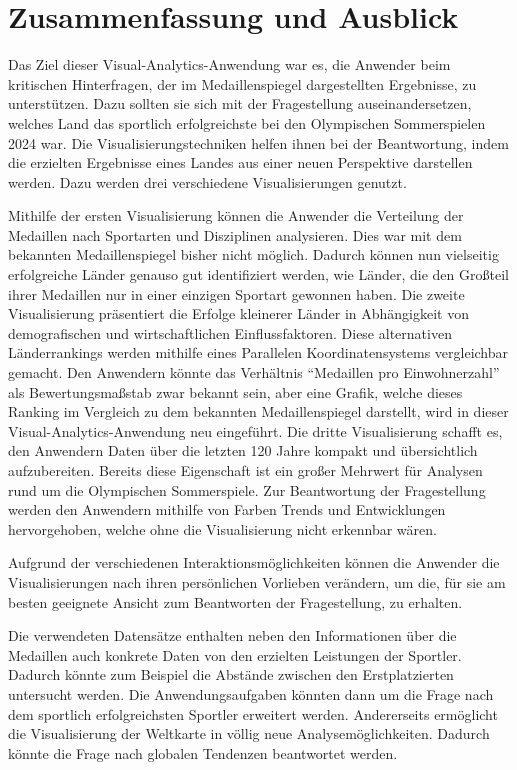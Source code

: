 \section{Zusammenfassung und Ausblick}

Das Ziel dieser Visual-Analytics-Anwendung war es, die Anwender beim kritischen Hinterfragen, der im Medaillenspiegel dargestellten Ergebnisse, zu unterstützen. Dazu sollten sie sich mit der Fragestellung auseinandersetzen, welches Land das sportlich erfolgreichste bei den Olympischen Sommerspielen 2024 war. Die Visualisierungstechniken helfen ihnen bei der Beantwortung, indem die erzielten Ergebnisse eines Landes aus einer neuen Perspektive darstellen werden. Dazu werden drei verschiedene Visualisierungen genutzt.

Mithilfe der ersten Visualisierung können die Anwender die Verteilung der Medaillen nach Sportarten und Disziplinen analysieren. Dies war mit dem bekannten Medaillenspiegel bisher nicht möglich. Dadurch können nun vielseitig erfolgreiche Länder genauso gut identifiziert werden, wie Länder, die den Großteil ihrer Medaillen nur in einer einzigen Sportart gewonnen haben. Die zweite Visualisierung präsentiert die Erfolge kleinerer Länder in Abhängigkeit von demografischen und wirtschaftlichen Einflussfaktoren. Diese alternativen Länderrankings werden mithilfe eines Parallelen Koordinatensystems vergleichbar gemacht. Den Anwendern könnte das Verhältnis \enquote{Medaillen pro Einwohnerzahl} als Bewertungsmaßstab zwar bekannt sein, aber eine Grafik, welche dieses Ranking im Vergleich zu dem bekannten Medaillenspiegel darstellt, wird in dieser Visual-Analytics-Anwendung neu eingeführt. Die dritte Visualisierung schafft es, den Anwendern Daten über die letzten 120 Jahre kompakt und übersichtlich aufzubereiten. Bereits diese Eigenschaft ist ein großer Mehrwert für Analysen rund um die Olympischen Sommerspiele. Zur Beantwortung der Fragestellung werden den Anwendern mithilfe von Farben Trends und Entwicklungen hervorgehoben, welche ohne die Visualisierung nicht erkennbar wären.

Aufgrund der verschiedenen Interaktionsmöglichkeiten können die Anwender die Visualisierungen nach ihren persönlichen Vorlieben verändern, um die, für sie am besten geeignete Ansicht zum Beantworten der Fragestellung, zu erhalten.

Die verwendeten Datensätze enthalten neben den Informationen über die Medaillen auch konkrete Daten von den erzielten Leistungen der Sportler. Dadurch könnte zum Beispiel die Abstände zwischen den Erstplatzierten untersucht werden. Die Anwendungsaufgaben könnten dann um die Frage nach dem sportlich erfolgreichsten Sportler erweitert werden. Andererseits ermöglicht die Visualisierung der Weltkarte in \cite{relWork2} völlig neue Analysemöglichkeiten. Dadurch könnte die Frage nach globalen Tendenzen beantwortet werden. 
